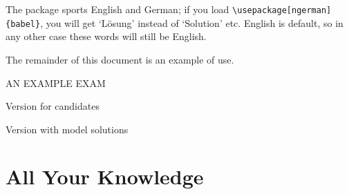 \documentclass[a4paper]{scrartcl}
\begin{document}
The package sports English and German; if you load \verb|\usepackage[ngerman]{babel}|, you will get `Lösung' instead of `Solution' etc. English is default, so in any other case these words will still be English. 

The remainder of this document is an example of use.


\newpage
\sffamily

\begin{center}
{\LARGE AN EXAMPLE EXAM}
\pagealert
\vspace{3ex}

\begin{hide}
    Version for candidates
\end{hide}

\begin{answer-}
    Version with model solutions
\end{answer-}

 
\end{center}

\newpage
\tableofcontents

\newpage

\part{All Your Knowledge}














\givetotalpoints
\end{document}
